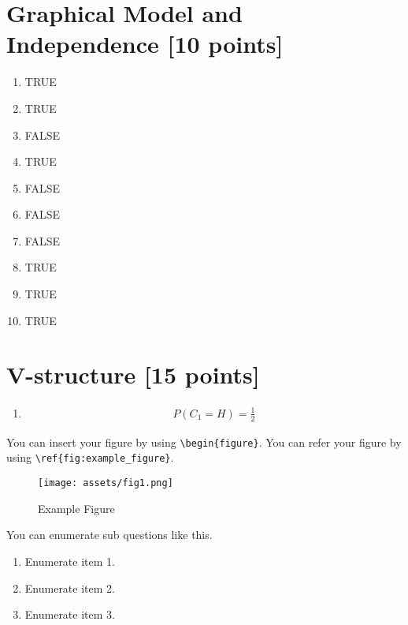 \documentclass[12pt,a4paper]{article}
\begin{document}
\section{Graphical Model and Independence [10 points]}

\begin{enumerate}
  \item TRUE
  \item TRUE
  \item FALSE
  \item TRUE
  \item FALSE
  \item FALSE
  \item FALSE
  \item TRUE
  \item TRUE
  \item TRUE
\end{enumerate}

\section{V-structure [15 points]}
\begin{enumerate}
  \item
  \begin{align}
  P(C_1=H)=\frac{1}{2}
  \end{align}
\end{enumerate}




You can insert your figure by using \verb|\begin{figure}|.
You can refer your figure by using \verb|\ref{fig:example_figure}|.

\begin{figure}[!h]
    \begin{center}
        \texttt{[image: assets/fig1.png]}
        \caption{Example Figure}
        \label{fig:example_figure}
    \end{center}
\end{figure}

You can enumerate sub questions like this.

\begin{enumerate}
    \item Enumerate item 1.
    \item Enumerate item 2.
    \item Enumerate item 3.
\end{enumerate}
\end{document}
